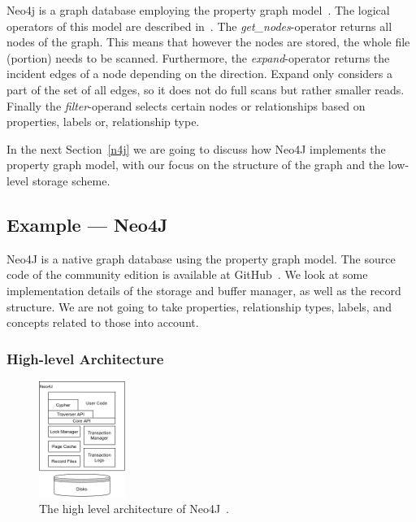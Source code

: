         
        Neo4j is a graph database employing the property graph model~\cite{robinson2015graph}.
        The logical operators of this model are described in~\autocite{Holsch2016Algeb}. 
        The \textit{get\_nodes}-operator returns all nodes of the graph.
        This means that however the nodes are stored, the whole file (portion) needs to be scanned.
        Furthermore, the \textit{expand}-operator returns the incident edges of a node depending on the direction.
        Expand only considers a part of the set of all edges, so it does not do full scans but rather smaller reads.
        Finally the \textit{filter}-operand selects certain nodes or relationships based on properties, labels or, relationship type.
        
        In the next Section~\ref{n4j} we are going to discuss how Neo4J implements the property graph model, with our focus on the structure of the graph and the low-level storage scheme.

    \subsection*{Example --- Neo4J}\label{n4j}
        Neo4J is a native graph database using the property graph model.
        The source code of the community edition is available at GitHub~\autocite{GitHubneo4j}.
        We look at some implementation details of the storage and buffer manager, as well as the record structure.
        We are not going to take properties, relationship types, labels, and concepts related to those into account.
        
        \subsubsection*{High-level Architecture}
        \begin{figure}[htp]
            \begin{center}
                \includegraphics[keepaspectratio,width=0.25\textwidth]{img/04-databases/N4J_HLA_Emil.png}
            \end{center}
            \caption{The high level architecture of Neo4J~\autocite{robinson2015graph}.} 
            \label{N4J_HLA_Emil}
        \end{figure}
        
